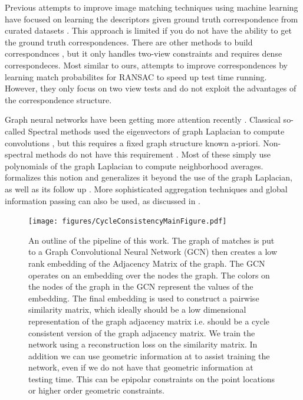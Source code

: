 \documentclass[10pt,twocolumn,letterpaper]{article}
\begin{document}
Previous attempts to improve image matching techniques using machine learning have focused on learning the descriptors given ground truth correspondence from curated datasets \cite{zagoruyko2015learning, yi2016lift, brachmann2017dsac}. This approach is limited if you do not have the ability to get the ground truth correspondences.
There are other methods to build correspondnces \cite{choy2016universal}, but it only handles two-view constraints and requires dense correspondeces.
Most similar to ours, \cite{yi2018learning} attempts to improve correspondences by learning match probabilites for RANSAC to speed up test time running. However, they only focus on two view tests and do not exploit the advantages of the correspondence structure.

Graph neural networks have been getting more attention recently 
\cite{bronstein2017geometric, bruna2013spectral, defferrard2016convolutional, kipf2016semi, scarselli2009graph, gama2018mimo, gama2018convolutional, battaglia2018relational}.
Classical so-called Spectral methods used the eigenvectors of graph Laplacian to compute convolutions \cite{bronstein2017geometric}, but this requires a fixed graph structure known a-priori.  
Non-spectral methods do not have this requirement \cite{bronstein2017geometric, kipf2016semi, scarselli2009graph, gama2018convolutional}. Most of these simply use polynomials of the graph Laplacian to compute neighborhood averages. \cite{gama2018mimo} formalizes this notion and generalizes it beyond the use of the graph Laplacian, as well as its follow up \cite{gama2018convolutional}. More sophisticated aggregation techniques and global information passing can also be used, as discussed in \cite{battaglia2018relational}.

\begin{figure}[t]
\begin{center}
  \texttt{[image: figures/CycleConsistencyMainFigure.pdf]}
\end{center}
  \caption{
    An outline of the pipeline of this work.
    The graph of matches is put to a Graph Convolutional Neural Network (GCN) \cite{kipf2016semi} then creates a low rank embedding of the Adjacency Matrix of the graph.
    The GCN operates on an embedding over the nodes the graph.
    The colors on the nodes of the graph in the GCN represent the values of the embedding.
    The final embedding is used to construct a pairwise similarity matrix, which ideally should be a low dimensional representation of the graph adjacency matrix i.e. should be a cycle consistent version of the graph adjacency matrix.
    We train the network using a reconstruction loss on the similarity matrix.
    In addition we can use geometric information at to assist training the network, even if we do not have that geometric information at testing time.
    This can be epipolar constraints on the point locations or higher order geometric constraints.
  }
\label{fig:pipeline}
\label{fig:onecol}
\end{figure}
\end{document}
